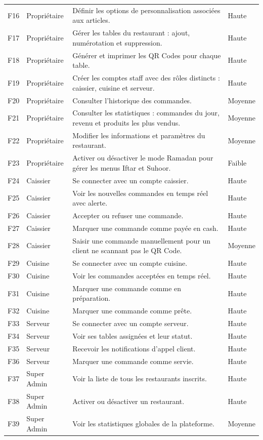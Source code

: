 \documentclass[12pt,a4paper]{report}
\begin{document}
{\begin{longtable}{p{1.2cm}p{2.8cm}p{8.4cm}p{1.8cm}}
    F16 & Propriétaire & Définir les options de personnalisation associées aux articles. & Haute \\
    F17 & Propriétaire & Gérer les tables du restaurant : ajout, numérotation et suppression. & Haute \\
    F18 & Propriétaire & Générer et imprimer les QR Codes pour chaque table. & Haute \\
    F19 & Propriétaire & Créer les comptes staff avec des rôles distincts : caissier, cuisine et serveur. & Haute \\
    F20 & Propriétaire & Consulter l'historique des commandes. & Moyenne \\
    F21 & Propriétaire & Consulter les statistiques : commandes du jour, revenu et produits les plus vendus. & Moyenne \\
    F22 & Propriétaire & Modifier les informations et paramètres du restaurant. & Moyenne \\
    F23 & Propriétaire & Activer ou désactiver le mode Ramadan pour gérer les menus Iftar et Suhoor. & Faible \\
    F24 & Caissier & Se connecter avec un compte caissier. & Haute \\
    F25 & Caissier & Voir les nouvelles commandes en temps réel avec alerte. & Haute \\
    F26 & Caissier & Accepter ou refuser une commande. & Haute \\
    F27 & Caissier & Marquer une commande comme payée en cash. & Haute \\
    F28 & Caissier & Saisir une commande manuellement pour un client ne scannant pas le QR Code. & Moyenne \\
    F29 & Cuisine & Se connecter avec un compte cuisine. & Haute \\
    F30 & Cuisine & Voir les commandes acceptées en temps réel. & Haute \\
    F31 & Cuisine & Marquer une commande comme en préparation. & Haute \\
    F32 & Cuisine & Marquer une commande comme prête. & Haute \\
    F33 & Serveur & Se connecter avec un compte serveur. & Haute \\
    F34 & Serveur & Voir ses tables assignées et leur statut. & Haute \\
    F35 & Serveur & Recevoir les notifications d'appel client. & Haute \\
    F36 & Serveur & Marquer une commande comme servie. & Haute \\
    F37 & Super Admin & Voir la liste de tous les restaurants inscrits. & Haute \\
    F38 & Super Admin & Activer ou désactiver un restaurant. & Haute \\
    F39 & Super Admin & Voir les statistiques globales de la plateforme. & Moyenne \\
    \bottomrule
\end{longtable}
}
\end{document}
